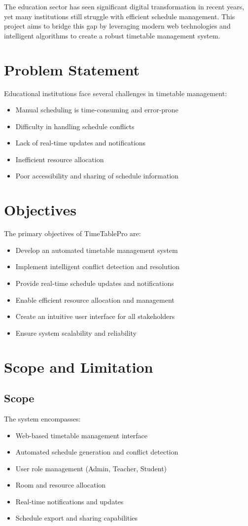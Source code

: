 \documentclass[12pt,a4paper]{report}
\begin{document}
The education sector has seen significant digital transformation in recent years, yet many institutions still struggle with efficient schedule management. This project aims to bridge this gap by leveraging modern web technologies and intelligent algorithms to create a robust timetable management system.

\section{Problem Statement}
Educational institutions face several challenges in timetable management:
\begin{itemize}
    \item Manual scheduling is time-consuming and error-prone
    \item Difficulty in handling schedule conflicts
    \item Lack of real-time updates and notifications
    \item Inefficient resource allocation
    \item Poor accessibility and sharing of schedule information
\end{itemize}

\section{Objectives}
The primary objectives of TimeTablePro are:
\begin{itemize}
    \item Develop an automated timetable management system
    \item Implement intelligent conflict detection and resolution
    \item Provide real-time schedule updates and notifications
    \item Enable efficient resource allocation and management
    \item Create an intuitive user interface for all stakeholders
    \item Ensure system scalability and reliability
\end{itemize}

\section{Scope and Limitation}
\subsection{Scope}
The system encompasses:
\begin{itemize}
    \item Web-based timetable management interface
    \item Automated schedule generation and conflict detection
    \item User role management (Admin, Teacher, Student)
    \item Room and resource allocation
    \item Real-time notifications and updates
    \item Schedule export and sharing capabilities
\end{itemize}
\end{document}
